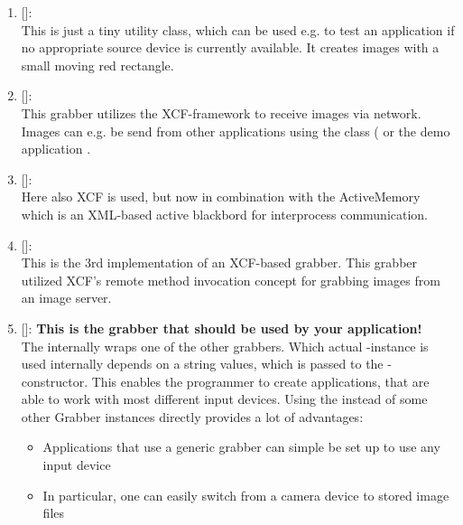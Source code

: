 \begin{enumerate}
The SwissRanger is a so-called time-of-flight camera from the Mesa-Imaging company\footnote{}. It uses a set of pulsed IR-LED's to compute depth images. This grabber uses the libmesasr-library for accessing camera features and image data. The SwissRanger camera also provides gray-scale images and a confidence map, which tells the user the estimated accuracy for each depth-pixel.
\item {} []:\\
This is just a tiny utility class, which can be used e.g. to test an application if no appropriate source device is currently available. It creates images with a small moving red rectangle.
\item {} []:\\
This grabber utilizes the XCF-framework to receive images via network. Images can e.g. be send from other applications using the  class ( or the demo application .
\item {} []:\\
Here also XCF is used, but now in combination with the ActiveMemory which is an XML-based active blackbord for interprocess communication. 
\item {} []:\\
This is the 3rd implementation of an XCF-based grabber. This grabber utilized XCF's remote method invocation concept for grabbing images from an image server.
\item {} []: \textbf{This is the grabber that should be used by your application!}\\
The  internally wraps one of the other grabbers. Which actual -instance is used internally depends on a string values, which is passed to the -constructor. This enables the programmer to create applications, that are able to work with most different input devices. Using the  instead of some other Grabber instances directly provides a lot of advantages:
\begin{itemize}
\item Applications that use a generic grabber can simple be set up to use any input device
\item In particular, one can easily switch from a camera device to stored image files

\end{itemize}
\end{enumerate}
